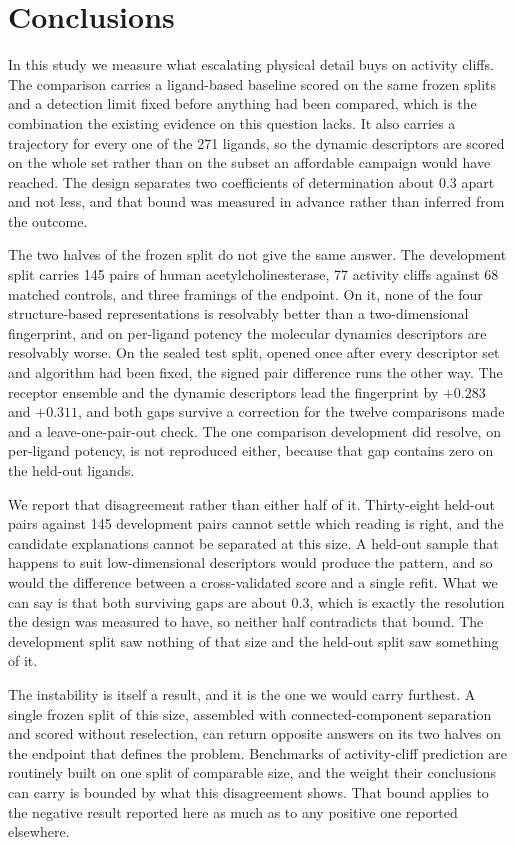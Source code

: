 \section{Conclusions}

In this study we measure what escalating physical detail buys on activity cliffs. The
comparison carries a ligand-based baseline scored on the same frozen splits and a
detection limit fixed before anything had been compared, which is the combination the
existing evidence on this question lacks. It also carries a trajectory for every one of
the 271 ligands, so the dynamic descriptors are scored on the whole set rather than on
the subset an affordable campaign would have reached. The design separates two coefficients of
determination about $0.3$ apart and not less, and that bound was measured in advance
rather than inferred from the outcome.

The two halves of the frozen split do not give the same answer. The development split carries 145 pairs
of human acetylcholinesterase, 77 activity cliffs against 68 matched controls, and
three framings of the endpoint. On it, none of the four structure-based representations
is resolvably better than a two-dimensional fingerprint, and on per-ligand potency the
molecular dynamics descriptors are resolvably worse. On the
sealed test split, opened once after every descriptor set and algorithm had been fixed,
the signed pair difference runs the other way. The receptor ensemble and the dynamic
descriptors lead the fingerprint by $+0.283$ and $+0.311$, and both gaps survive a
correction for the twelve comparisons made and a leave-one-pair-out check. The one
comparison development did resolve, on per-ligand potency, is not reproduced either,
because that gap contains zero on the held-out ligands.

We report that disagreement rather than either half of it. Thirty-eight held-out pairs
against 145 development pairs cannot settle which reading is right, and the candidate
explanations cannot be separated at this size. A held-out sample that happens to suit
low-dimensional descriptors would produce the pattern, and so would the difference
between a cross-validated score and a single refit. What we can say is that both
surviving gaps are about $0.3$, which is exactly the resolution the design was measured
to have, so neither half contradicts that bound. The development split saw nothing of
that size and the held-out split saw something of it.

The instability is itself a result, and it is the one we would carry furthest. A single
frozen split of this size, assembled with connected-component separation and scored
without reselection, can return opposite answers on its two halves on the endpoint that
defines the problem. Benchmarks of activity-cliff prediction are routinely built on one
split of comparable size, and the weight their conclusions can carry is bounded by what
this disagreement shows. That bound applies to the negative result reported here as
much as to any positive one reported elsewhere.

